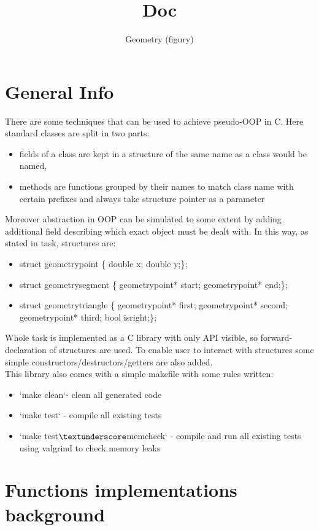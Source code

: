 \documentclass{article}
\title{Doc}
\author{Geometry (figury)}
\date{}
\begin{document}
\maketitle
\section{General Info}
There are some techniques that can be used
to achieve pseudo-OOP in C. Here standard classes are split in two parts:
\begin{itemize}
	\item fields of a class are kept in a structure of the same name as a class would be named,
	\item methods are functions grouped by their names to match class name with certain prefixes and always take structure pointer as a parameter
\end{itemize}  
Moreover abstraction in OOP can be simulated to some extent by adding additional field describing which exact object must be dealt with.
In this way, as stated in task, structures are:
\begin{itemize}
	\item struct geometry\textunderscore point \{ double x; double y;\};
	\item struct geometry\textunderscore segment \{ geometry\textunderscore point* start; geometry\textunderscore point* end;\};
	\item struct geometry\textunderscore triangle \{ geometry\textunderscore point* first; geometry\textunderscore point* second; geometry\textunderscore point* third; bool is\textunderscore right;\};
\end{itemize}
Whole task is implemented as a C library with only API visible, so forward-declaration of structures are used.
To enable user to interact with structures some simple constructors/destructors/getters are also added.\\
This library also comes with a simple makefile with some rules written:
\begin{itemize}
	\item `make clean`- clean all generated code
	\item `make test` - compile all existing tests
	\item `make test$\textunderscore$memcheck` - compile and run all existing tests using valgrind to check memory leaks
\end{itemize}


\section{Functions implementations background}
\end{document}
